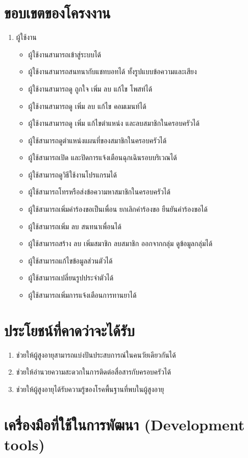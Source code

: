 \section{ขอบเขตของโครงงาน}
\begin{enumerate}[label=1.3.\arabic*]
	\item ผู้ใช้งาน
	 \begin{itemize}
		\item ผู้ใช้งานสามารถเข้าสู่ระบบได้
		\item ผู้ใช้งานสามารถสนทนากับแชทบอทได้ ทั้งรูปแบบข้อความและเสียง
		\item ผู้ใช้งานสามารถดู ถูกใจ เพิ่ม ลบ แก้ไข โพสท์ได้
		\item ผู้ใช้งานสามารถดู เพิ่ม ลบ แก้ไข คอมเมนท์ได้
		\item ผู้ใช้งานสามารถดู เพิ่ม แก้ไขตำแหน่ง และลบสมาชิกในครอบครัวได้
		\item ผู้ใช้สามารถดูตำแหน่งแผนที่ของสมาชิกในครอบครัวได้
		\item ผู้ใช้สามารถเปิด และปิดการแจ้งเตือนฉุกเฉินรอบบริเวณได้
		\item ผู้ใช้สามารถดูวิธีใช้งานโปรแกรมได้
		\item ผู้ใช้สามารถโทรหรือส่งข้อความหาสมาชิกในครอบครัวได้
		\item ผู้ใช้สามารถเพิ่มคำร้องขอเป็นเพื่อน ยกเลิกคำร้องขอ ยืนยันคำร้องขอได้
		\item ผู้ใช้สามารถเพิ่ม ลบ สนทนาเพื่อนได้
		\item ผู้ใช้สามารถสร้าง ลบ เพิ่มสมาชิก ลบสมาชิก ออกจากกลุ่ม ดูข้อมูลกลุ่มได้
		\item ผู้ใช้สามารถแก้ไขข้อมูลส่วนตัวได้
		\item ผู้ใช้สามารถเปลี่ยนรูปประจำตัวได้
		\item ผู้ใช้สามารถเพิ่มการแจ้งเตือนการทานยาได้
	 \end{itemize}
\end{enumerate}
\section{ประโยชน์ที่คาดว่าจะได้รับ}
\begin{enumerate}
	\item ช่วยให้ผู้สูงอายุสามารถแบ่งปันประสบการณ์ในคนวัยเดียวกันได้
	\item ช่วยให้อำนวยความสะดวกในการติดต่อสื่อสารกับครอบครัวได้
	\item ช่วยให้ผู้สูงอายุได้รับความรู้ของโรคพื้นฐานที่พบในผู้สูงอายุ
\end{enumerate}
\section{เครื่องมือที่ใช้ในการพัฒนา (Development tools)}
